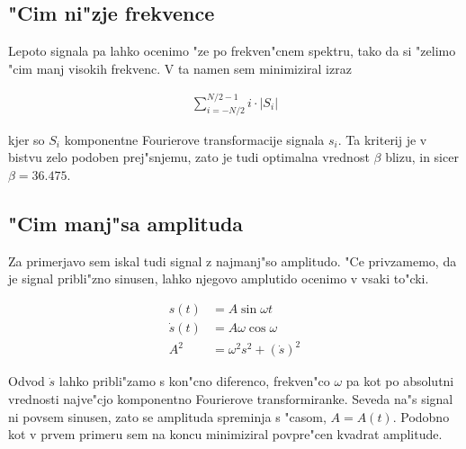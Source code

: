 \documentclass[a4paper,10pt]{article}
\begin{document}
\subsection{"Cim ni"zje frekvence}

Lepoto signala pa lahko ocenimo "ze po frekven"cnem spektru, tako da si "zelimo "cim manj visokih frekvenc. V ta namen sem minimiziral izraz

\begin{align}
 \sum_{i=-N/2}^{N/2-1} i\cdot|S_i|
\end{align}

kjer so $S_i$ komponentne Fourierove transformacije signala $s_i$. Ta kriterij je v bistvu zelo podoben prej"snjemu, zato je tudi optimalna vrednost $\beta$ blizu, in sicer $\beta = 36.475$. 

\subsection{"Cim manj"sa amplituda}

Za primerjavo sem iskal tudi signal z najmanj"so amplitudo. "Ce privzamemo, da je signal pribli"zno sinusen, lahko njegovo amplutido ocenimo v vsaki to"cki. 

\begin{align}
 s(t) &= A\sin \omega t \\
 \dot s(t) &= A\omega \cos \omega \\ 
 A^2 &= \omega^2 s^2 + (\dot{s})^2
\end{align}

Odvod $\dot s$ lahko pribli"zamo s kon"cno diferenco, frekven"co $\omega$ pa kot po absolutni vrednosti najve"cjo komponentno Fourierove transformiranke. Seveda na"s signal ni povsem sinusen, zato se amplituda spreminja s "casom, $A = A(t)$. Podobno kot v prvem primeru sem na koncu minimiziral povpre"cen kvadrat amplitude. 
\end{document}
